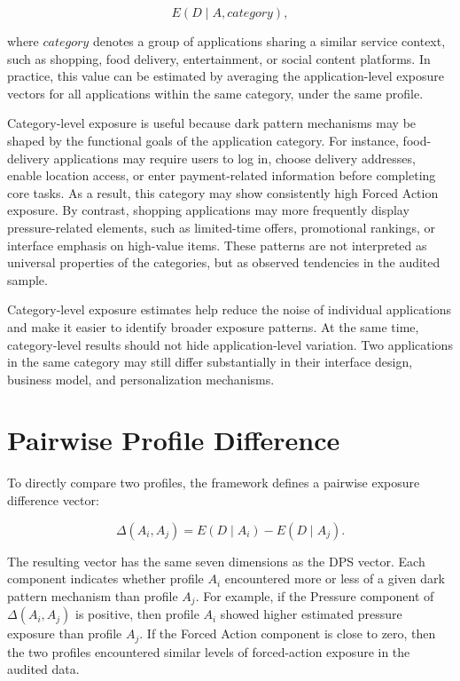 \[
E(D \mid A, category),
\]

where \(category\) denotes a group of applications sharing a similar service context, such as shopping, food delivery, entertainment, or social content platforms. In practice, this value can be estimated by averaging the application-level exposure vectors for all applications within the same category, under the same profile.

Category-level exposure is useful because dark pattern mechanisms may be shaped by the functional goals of the application category. For instance, food-delivery applications may require users to log in, choose delivery addresses, enable location access, or enter payment-related information before completing core tasks. As a result, this category may show consistently high Forced Action exposure. By contrast, shopping applications may more frequently display pressure-related elements, such as limited-time offers, promotional rankings, or interface emphasis on high-value items. These patterns are not interpreted as universal properties of the categories, but as observed tendencies in the audited sample.

Category-level exposure estimates help reduce the noise of individual applications and make it easier to identify broader exposure patterns. At the same time, category-level results should not hide application-level variation. Two applications in the same category may still differ substantially in their interface design, business model, and personalization mechanisms.

\section{Pairwise Profile Difference}

To directly compare two profiles, the framework defines a pairwise exposure difference vector:

\[
\Delta(A_i, A_j) = E(D \mid A_i) - E(D \mid A_j).
\]

The resulting vector has the same seven dimensions as the DPS vector. Each component indicates whether profile \(A_i\) encountered more or less of a given dark pattern mechanism than profile \(A_j\). For example, if the Pressure component of \(\Delta(A_i, A_j)\) is positive, then profile \(A_i\) showed higher estimated pressure exposure than profile \(A_j\). If the Forced Action component is close to zero, then the two profiles encountered similar levels of forced-action exposure in the audited data.

